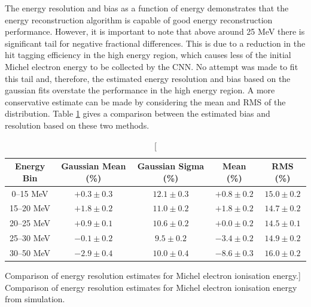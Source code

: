 The energy resolution and bias as a function of energy demonstrates that the
energy reconstruction algorithm is capable of good energy reconstruction
performance. However, it is important to note that above around 25 MeV there is
significant tail for negative fractional differences. This is due to a reduction
in the hit tagging efficiency in the high energy region, which causes less of
the initial Michel electron energy to be collected by the CNN. No attempt was
made to fit this tail and, therefore, the estimated energy resolution and bias
based on the gaussian fits overstate the performance in the high energy region.
A more conservative estimate can be made by considering the mean and RMS of the
distribution. Table \ref{tab:gaus_v_mean} gives a comparison between the
estimated bias and resolution based on these two methods.
\begin{table}
	\centering
	\bgroup
	\def\arraystretch{1.5}
	\begin{tabular}{c|c|c|c|c}
		Energy Bin & Gaussian Mean (\%) & Gaussian Sigma (\%) & Mean  (\%)     & RMS (\%)   \\ \hline
		0--15 MeV  & $+0.3 \pm 0.3$     & $12.1 \pm 0.3$      & $+0.8 \pm 0.2$ & $15.0 \pm 0.2$  \\
		15--20 MeV & $+1.8 \pm 0.2$     & $11.0 \pm 0.2$      & $+1.8 \pm 0.2$ & $14.7 \pm 0.2$ \\
		20--25 MeV & $+0.9 \pm 0.1$     & $10.6 \pm 0.2$      & $+0.0 \pm 0.2$ & $14.5 \pm 0.1$ \\
		25--30 MeV & $-0.1 \pm 0.2$     & $9.5 \pm 0.2$       & $-3.4 \pm 0.2$ & $14.9 \pm 0.2$ \\
		30--50 MeV & $-2.9 \pm 0.4$     & $10.0 \pm 0.4$      & $-8.6 \pm 0.3$ & $16.0 \pm 0.2$\\


	\end{tabular}
	\egroup
	\caption
	[Comparison of energy resolution estimates for Michel electron ionisation
	energy.]
	{ Comparison of energy resolution estimates for Michel electron ionisation
	energy from \protodune{} simulation. }
	\label{tab:gaus_v_mean}
\end{table}

